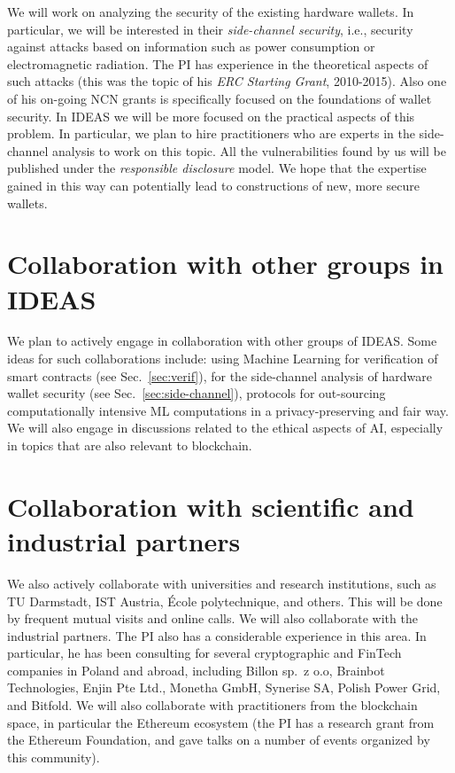 \documentclass{article}
\begin{document}
We will work on analyzing the security of the existing hardware wallets. In particular, we will be interested in their \emph{side-channel security}, i.e., security against attacks based on information such as power consumption or electromagnetic radiation. The PI has experience in the theoretical aspects of such attacks (this was the topic of his \emph{ERC Starting Grant}, 2010-2015). Also one of his on-going NCN grants is specifically focused on the foundations of wallet security. In IDEAS we will be more focused on the practical aspects of this problem. In particular, we plan to hire practitioners who are experts in the side-channel analysis to work on this topic. All the vulnerabilities found by us will be published under the \emph{responsible disclosure} model. We hope that the expertise gained in this way can potentially lead to constructions of new, more secure wallets. 

\section{Collaboration with other groups in IDEAS}

We plan to actively engage in collaboration with other groups of IDEAS. Some ideas for such collaborations include: using Machine Learning for verification of smart contracts (see Sec.~\ref{sec:verif}), for the side-channel analysis of hardware wallet security (see Sec.~\ref{sec:side-channel}), protocols for out-sourcing computationally intensive ML computations in a privacy-preserving and fair way. We will also engage in discussions related to the ethical aspects of AI, especially in topics that are also relevant to blockchain.



\section{Collaboration with scientific and industrial partners}

We also actively collaborate with universities and research institutions, such as TU Darmstadt, IST Austria, \'Ecole polytechnique, and others. This will be done by frequent mutual visits and online calls. We will also collaborate with the industrial partners. The PI also has a considerable experience in this area. In particular, he has been consulting for several cryptographic and FinTech companies in Poland and abroad, including  Billon sp.~z o.o, Brainbot Technologies, Enjin Pte Ltd., Monetha GmbH, Synerise SA, Polish Power Grid, and  Bitfold. We will also collaborate with practitioners from the blockchain space, in particular the Ethereum ecosystem (the PI has a research grant from the Ethereum Foundation, and gave talks on a number of events organized by this community). 
\end{document}

